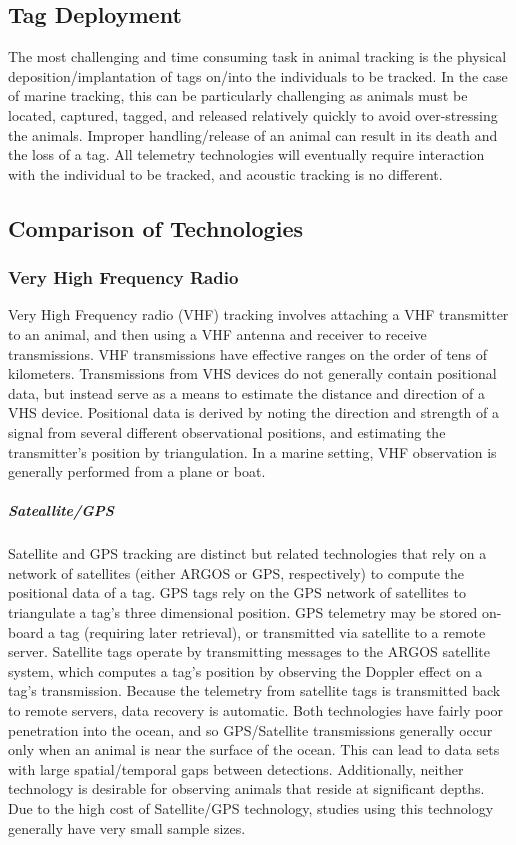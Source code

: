 \subsection{Tag Deployment}
The most challenging and time consuming task in animal tracking is the physical deposition/implantation of tags on/into the individuals to be tracked.  In the case of marine tracking, this can be particularly challenging as animals must be located, captured, tagged, and released relatively quickly to avoid over-stressing the animals.  Improper handling/release of an animal can result in its death and the loss of a tag.  All telemetry technologies will eventually require interaction with the individual to be tracked, and acoustic tracking is no different.

\subsection{Comparison of Technologies}
\subsubsection{Very High Frequency Radio}
Very High Frequency radio (VHF) tracking involves attaching a VHF transmitter to an animal, and then using a VHF antenna and receiver to receive transmissions.  VHF transmissions have effective ranges on the order of tens of kilometers.  Transmissions from VHS devices do not generally contain positional data, but instead serve as a means to estimate the distance and direction of a VHS device.  Positional data is derived by noting the direction and strength of a signal from several different observational positions, and estimating the transmitter's position by triangulation\cite{USDA}.  In a marine setting, VHF observation is generally performed from a plane or boat\cite{Wikipedia_RadioTracking}.

\subparagraph{Sateallite/GPS}
Satellite and GPS tracking are distinct but related technologies that rely on a network of satellites (either ARGOS or GPS, respectively) to compute the positional data of a tag. GPS tags rely on the GPS network of satellites to triangulate a tag's three dimensional position. GPS telemetry may be stored on-board a tag (requiring later retrieval), or transmitted via satellite to a remote server\cite{USDA}. Satellite tags operate by transmitting messages to the ARGOS satellite system, which computes a tag's position by observing the Doppler effect on a tag's transmission\cite{ARGOS}.  Because the telemetry from satellite tags is transmitted back to remote servers, data recovery is automatic.  Both technologies have fairly poor penetration into the ocean, and so GPS/Satellite transmissions generally occur only when an animal is near the surface of the ocean.  This can lead to data sets with large spatial/temporal gaps between detections.  Additionally, neither technology is desirable for observing animals that reside at significant depths.  Due to the high cost of Satellite/GPS technology, studies using this technology generally have very small sample sizes.  

